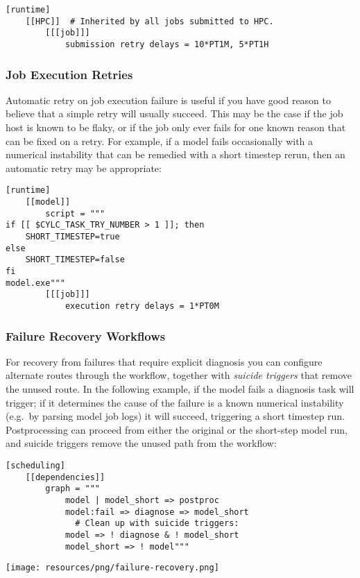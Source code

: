 \lstset{language=suiterc}
\begin{lstlisting}
[runtime]
    [[HPC]]  # Inherited by all jobs submitted to HPC.
        [[[job]]]
            submission retry delays = 10*PT1M, 5*PT1H
\end{lstlisting}

\subsubsection{Job Execution Retries}

Automatic retry on job execution failure is useful if you have good reason to
believe that a simple retry will usually succeed. This may be the case if the
job host is known to be flaky, or if the job only ever fails for one known
reason that can be fixed on a retry. For example, if a model fails occasionally
with a numerical instability that can be remedied with a short timestep rerun,
then an automatic retry may be appropriate:

\lstset{language=suiterc}
\begin{lstlisting}
[runtime]
    [[model]]
        script = """
if [[ $CYLC_TASK_TRY_NUMBER > 1 ]]; then
    SHORT_TIMESTEP=true
else
    SHORT_TIMESTEP=false
fi
model.exe"""
        [[[job]]]
            execution retry delays = 1*PT0M
\end{lstlisting}

\subsubsection{Failure Recovery Workflows}

For recovery from failures that require explicit diagnosis you can configure
alternate routes through the workflow, together with {\em suicide triggers}
that remove the unused route. In the following example, if the model fails a
diagnosis task will trigger; if it determines the cause of the failure is a
known numerical instability (e.g.\ by parsing model job logs) it will succeed,
triggering a short timestep run. Postprocessing can proceed from either the
original or the short-step model run, and suicide triggers remove the unused
path from the workflow:

\lstset{language=suiterc}
\begin{lstlisting}
[scheduling]
    [[dependencies]]
        graph = """
            model | model_short => postproc
            model:fail => diagnose => model_short
              # Clean up with suicide triggers:
            model => ! diagnose & ! model_short
            model_short => ! model"""
\end{lstlisting}
  \texttt{[image: resources/png/failure-recovery.png]}

